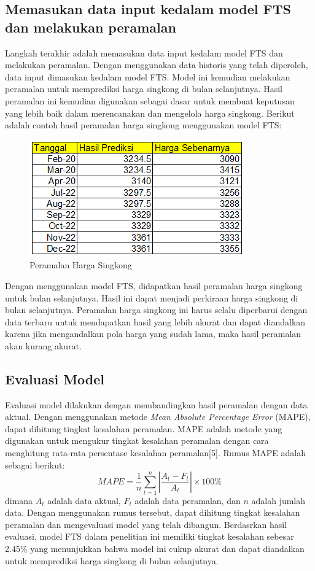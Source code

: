 \documentclass[conference]{IEEEtran}
\begin{document}
\subsection{Memasukan data input kedalam model FTS dan melakukan peramalan}
Langkah terakhir adalah memasukan data input kedalam model FTS dan melakukan peramalan. Dengan menggunakan data historis yang telah diperoleh, data input dimasukan kedalam model FTS. Model ini kemudian melakukan peramalan untuk memprediksi harga singkong di bulan selanjutnya. Hasil peramalan ini kemudian digunakan sebagai dasar untuk membuat keputusan yang lebih baik dalam merencanakan dan mengelola harga singkong. Berikut adalah contoh hasil peramalan harga singkong menggunakan model FTS:
\begin{figure}[H]
    \centering
    \includegraphics[scale=0.5]{images/Peramalan.png} 
    \caption{Peramalan Harga Singkong}
\end{figure}
Dengan menggunakan model FTS, didapatkan hasil peramalan harga singkong untuk bulan selanjutnya. Hasil ini dapat menjadi perkiraan harga singkong di bulan selanjutnya. Peramalan harga singkong ini harus selalu diperbarui dengan data terbaru untuk mendapatkan hasil yang lebih akurat dan dapat diandalkan karena jika mengandalkan pola harga yang sudah lama, maka hasil peramalan akan kurang akurat.

\subsection{Evaluasi Model}
Evaluasi model dilakukan dengan membandingkan hasil peramalan dengan data aktual. Dengan menggunakan metode \textit{Mean Absolute Percentage Error} (MAPE), dapat dihitung tingkat kesalahan peramalan. MAPE adalah metode yang digunakan untuk mengukur tingkat kesalahan peramalan dengan cara menghitung rata-rata persentase kesalahan peramalan[5]. Rumus MAPE adalah sebagai berikut:
\begin{equation}
    MAPE = \frac{1}{n} \sum_{t=1}^{n} \left| \frac{A_t - F_t}{A_t} \right| \times 100\%
\end{equation}
dimana $A_t$ adalah data aktual, $F_t$ adalah data peramalan, dan $n$ adalah jumlah data. Dengan menggunakan rumus tersebut, dapat dihitung tingkat kesalahan peramalan dan mengevaluasi model yang telah dibangun. Berdasrkan hasil evaluasi, model FTS dalam penelitian ini memiliki tingkat kesalahan sebesar 2.45\% yang menunjukkan bahwa model ini cukup akurat dan dapat diandalkan untuk memprediksi harga singkong di bulan selanjutnya.
\end{document}
